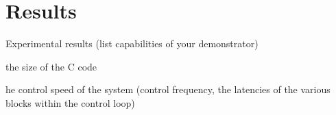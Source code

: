 \documentclass[final]{article}
\begin{document}
\section{Results}
Experimental results (list capabilities of your demonstrator)

the size of the C code

he control speed of the system (control frequency, the latencies of the various blocks within the control loop)

\end{document}
